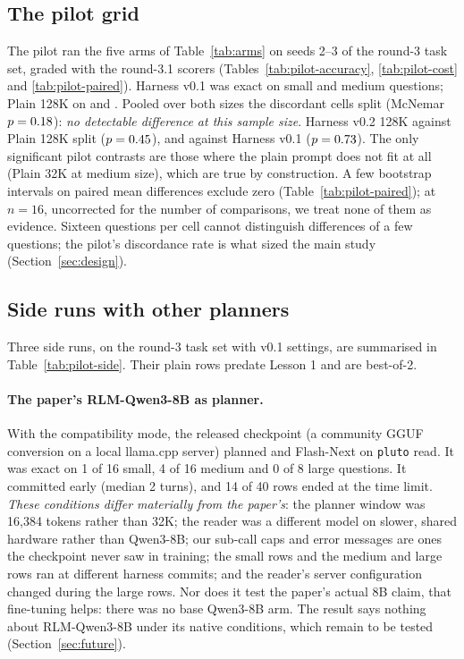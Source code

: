 \documentclass[11pt]{article}
\newcommand{\pVoneS}{\pilotExacthvZeroOneThreeTwoksmall}
\newcommand{\pVoneM}{\pilotExacthvZeroOneThreeTwokmedium}
\newcommand{\pPlainLongS}{\pilotExactplainOneThreeOneksmall}
\newcommand{\pPlainLongM}{\pilotExactplainOneThreeOnekmedium}
\newcommand{\pPVoneVsPlainLong}{\pilotPhvZeroOneThreeTwokvsplainOneThreeOnekpooled}
\newcommand{\pBCVoneVsPlainLong}{\pilotBChvZeroOneThreeTwokvsplainOneThreeOnekpooled}
\newcommand{\pPVoneVsVtwoLong}{\pilotPhvZeroOneThreeTwokvshvZeroTwoOneThreeOnekpooled}
\newcommand{\pBCVoneVsVtwoLong}{\pilotBChvZeroOneThreeTwokvshvZeroTwoOneThreeOnekpooled}
\newcommand{\pPVtwoVsPlainLong}{\pilotPhvZeroTwoOneThreeOnekvsplainOneThreeOnekpooled}
\newcommand{\pBCVtwoVsPlainLong}{\pilotBChvZeroTwoOneThreeOnekvsplainOneThreeOnekpooled}
\newcommand{\code}[1]{\texttt{#1}}
\begin{document}
\subsection{The pilot grid}
The pilot ran the five arms of Table~\ref{tab:arms} on seeds 2--3 of the round-3 task
set, graded with the round-3.1 scorers (Tables~\ref{tab:pilot-accuracy},
\ref{tab:pilot-cost} and \ref{tab:pilot-paired}). Harness v0.1 was exact on
\pVoneS{} small and \pVoneM{} medium questions; Plain 128K on \pPlainLongS{} and
\pPlainLongM{}. Pooled over both sizes the discordant cells split
\pBCVoneVsPlainLong{} (McNemar $p = \pPVoneVsPlainLong$): \emph{no detectable
difference at this sample size}. Harness v0.2 128K against Plain 128K split
\pBCVtwoVsPlainLong{} ($p = \pPVtwoVsPlainLong$), and against Harness v0.1
\pBCVoneVsVtwoLong{} ($p = \pPVoneVsVtwoLong$). The only significant pilot
contrasts are those where the plain prompt does not fit at all (Plain 32K at medium
size), which are true by construction. A few bootstrap intervals on paired mean
differences exclude zero (Table~\ref{tab:pilot-paired}); at $n = 16$, uncorrected
for the number of comparisons, we treat none of them as evidence. Sixteen questions per cell cannot
distinguish differences of a few questions; the pilot's discordance rate is what sized
the main study (Section~\ref{sec:design}).





\subsection{Side runs with other planners}
Three side runs, on the round-3 task set with v0.1 settings, are summarised in
Table~\ref{tab:pilot-side}. Their plain rows predate Lesson 1 and are best-of-2.

\paragraph{The paper's RLM-Qwen3-8B as planner.} With the compatibility mode, the
released checkpoint (a community GGUF conversion on a local llama.cpp server) planned
and Flash-Next on \code{pluto} read. It was exact on 1 of 16 small, 4 of 16
medium and 0 of 8 large questions. It committed early (median 2 turns), and 14 of
40 rows ended at the time limit.
\emph{These conditions differ materially from the paper's}: the planner window was
16,384 tokens rather than 32K; the reader was a different model on slower, shared
hardware rather than Qwen3-8B; our sub-call caps and error messages are ones the
checkpoint never saw in training; the small rows and the medium and large rows ran at
different harness commits; and the reader's server configuration changed during the
large rows. Nor does it test the paper's actual 8B claim, that fine-tuning helps:
there was no base Qwen3-8B arm. The result says nothing about RLM-Qwen3-8B under its
native conditions, which remain to be tested (Section~\ref{sec:future}).
\end{document}
